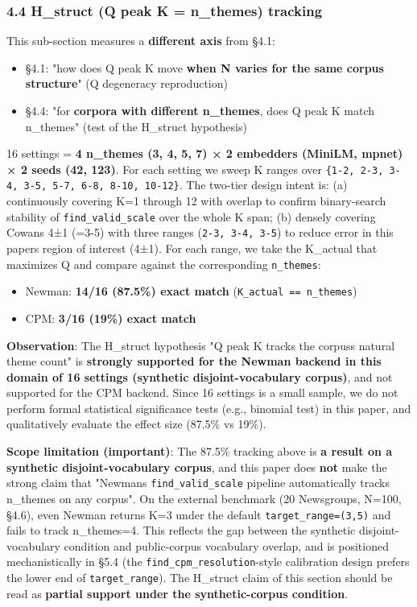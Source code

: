 \documentclass[
]{article}
\providecommand{\tightlist}{%
  \setlength{\itemsep}{0pt}\setlength{\parskip}{0pt}}
\begin{document}
\subsubsection{4.4 H\_struct (Q peak K = n\_themes)
tracking}\label{44-h_struct-q-peak-k--n_themes-tracking}

This sub-section measures a \textbf{different axis} from §4.1:

\begin{itemize}
\tightlist
\item
  §4.1: "how does Q peak K move \textbf{when N varies for the same
  corpus structure}" (Q degeneracy reproduction)
\item
  §4.4: "for \textbf{corpora with different n\_themes}, does Q peak K
  match n\_themes" (test of the H\_struct hypothesis)
\end{itemize}

16 settings = \textbf{4 n\_themes (3, 4, 5, 7) × 2 embedders (MiniLM,
mpnet) × 2 seeds (42, 123)}. For each setting we sweep K ranges over
\texttt{\{1-2,\ 2-3,\ 3-4,\ 3-5,\ 5-7,\ 6-8,\ 8-10,\ 10-12\}}. The
two-tier design intent is: (a) continuously covering K=1 through 12 with
overlap to confirm binary-search stability of
\texttt{find\_valid\_scale} over the whole K span; (b) densely covering
Cowan\textquotesingle s 4±1 (=3-5) with three ranges
(\texttt{2-3,\ 3-4,\ 3-5}) to reduce error in this
paper\textquotesingle s region of interest (4±1). For each range, we
take the K\_actual that maximizes Q and compare against the
corresponding \texttt{n\_themes}:

\begin{itemize}
\tightlist
\item
  Newman: \textbf{14/16 (87.5\%) exact match}
  (\texttt{K\_actual\ ==\ n\_themes})
\item
  CPM: \textbf{3/16 (19\%) exact match}
\end{itemize}

\textbf{Observation}: The H\_struct hypothesis "Q peak K tracks the
corpus\textquotesingle s natural theme count" is \textbf{strongly
supported for the Newman backend in this domain of 16 settings
(synthetic disjoint-vocabulary corpus)}, and not supported for the CPM
backend. Since 16 settings is a small sample, we do not perform formal
statistical significance tests (e.g., binomial test) in this paper, and
qualitatively evaluate the effect size (87.5\% vs 19\%).

\textbf{Scope limitation (important)}: The 87.5\% tracking above is
\textbf{a result on a synthetic disjoint-vocabulary corpus}, and this
paper does \textbf{not} make the strong claim that
"Newman\textquotesingle s \texttt{find\_valid\_scale} pipeline
automatically tracks n\_themes on any corpus". On the external benchmark
(20 Newsgroups, N=100, §4.6), even Newman returns K=3 under the default
\texttt{target\_range=(3,5)} and fails to track n\_themes=4. This
reflects the gap between the synthetic disjoint-vocabulary condition and
public-corpus vocabulary overlap, and is positioned mechanistically in
§5.4 (the \texttt{find\_cpm\_resolution}-style calibration design
prefers the lower end of \texttt{target\_range}). The H\_struct claim of
this section should be read as \textbf{partial support under the
synthetic-corpus condition}.
\end{document}
